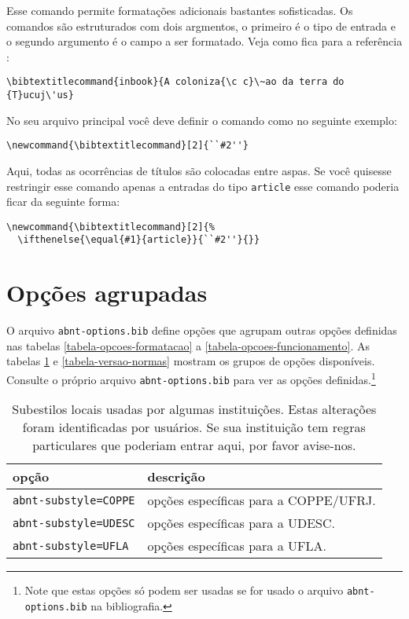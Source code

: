 \documentclass[espacosimples]{abnt}
\begin{document}
Esse comando permite formatações adicionais bastantes sofisticadas.
Os comandos são estruturados com dois argmentos, o primeiro é o tipo
de entrada e o segundo argumento é o campo a ser formatado.
Veja como fica para a referência :
\begin{verbatim}
\bibtextitlecommand{inbook}{A coloniza{\c c}\~ao da terra do {T}ucuj\'us}
\end{verbatim}

No seu arquivo principal você deve definir o comando como no seguinte exemplo:
\begin{verbatim}
\newcommand{\bibtextitlecommand}[2]{``#2''}
\end{verbatim}
Aqui, todas as ocorrências de títulos são colocadas entre aspas.
Se você quisesse restringir esse comando apenas a entradas do tipo {\tt article}
esse comando poderia ficar da seguinte forma:
\begin{verbatim}
\newcommand{\bibtextitlecommand}[2]{%
  \ifthenelse{\equal{#1}{article}}{``#2''}{}}
\end{verbatim}

\clearpage
\section{Opções agrupadas}

O arquivo {\tt abnt-options.bib} define opções que agrupam outras opções
definidas nas tabelas \ref{tabela-opcoes-formatacao} a \ref{tabela-opcoes-funcionamento}.
As tabelas \ref{tabela-subestilos} e \ref{tabela-versao-normas} mostram
os grupos de opções disponíveis. Consulte o próprio arquivo {\tt abnt-options.bib}
para ver as opções 
definidas.\footnote{Note que estas opções só podem ser usadas se for usado o arquivo  {\tt abnt-options.bib}
na bibliografia.}

\begin{table}[htbp]
\begin{center}
\begin{tabular}{lp{9cm}}\hline\hline
opção  & descrição \\ \hline
{\tt abnt-substyle=COPPE} & opções específicas para a COPPE/UFRJ.\\
{\tt abnt-substyle=UDESC} & opções específicas para a UDESC.\\
{\tt abnt-substyle=UFLA} & opções específicas para a UFLA.\\
\hline\hline
\end{tabular}
\end{center}
\caption[Subestilos de diversas instituições]{
Subestilos locais usadas por algumas instituições. Estas alterações
foram identificadas por usuários. Se sua instituição
tem regras particulares que poderiam entrar aqui, por favor avise-nos.}
\label{tabela-subestilos}
\end{table}
\end{document}
